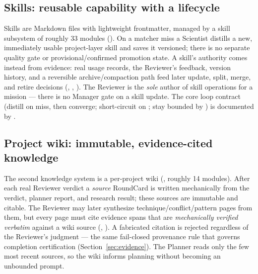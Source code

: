 \subsection{Skills: reusable capability with a lifecycle}

Skills are Markdown files with lightweight frontmatter, managed by a skill
subsystem of roughly 33 modules (). On a matcher
miss a Scientist distills a new, immediately usable project-layer skill and saves
it versioned; there is no separate quality gate or provisional/confirmed promotion
state. A skill's authority comes instead from evidence: real usage records, the
Reviewer's feedback, version history, and a reversible archive/compaction path
feed later update, split, merge, and retire decisions
(, ,
). The Reviewer is the \emph{sole} author of skill
operations for a mission --- there is no Manager gate on a skill update. The core
loop contract (distill on miss, then converge; short-circuit on ;
stay bounded by ) is documented by
.

\subsection{Project wiki: immutable, evidence-cited knowledge}

The second knowledge system is a per-project wiki (,
roughly 14 modules). After each real Reviewer verdict a \emph{source} RoundCard is
written mechanically from the verdict, planner report, and research result; these
sources are immutable and citable. The Reviewer may later synthesize
technique/conflict/pattern pages from them, but every page must cite evidence
spans that are \emph{mechanically verified verbatim} against a wiki source
(, ). A fabricated citation is
rejected regardless of the Reviewer's judgment --- the same fail-closed provenance
rule that governs completion certification (Section~\ref{sec:evidence}). The
Planner reads only the few most recent sources, so the wiki informs planning
without becoming an unbounded prompt.
